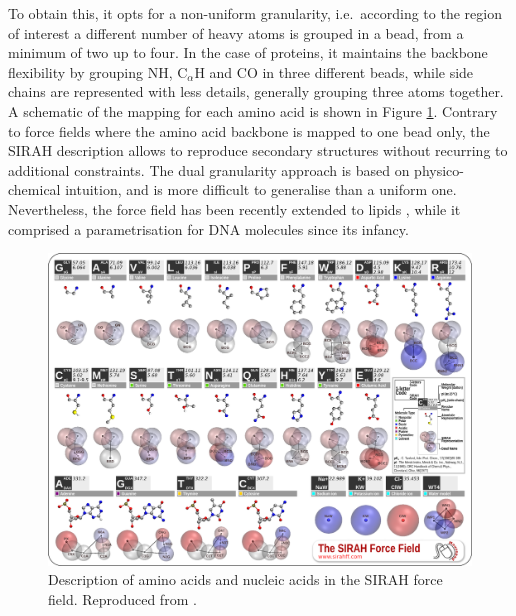 To obtain this, it opts for a non-uniform granularity, i.e.\ according to the region of interest a different number of heavy atoms is grouped in a bead, from a minimum of two up to four. In the case of proteins, it maintains the backbone flexibility by grouping NH, C$_\alpha$H and CO in three different beads, while side chains are represented with less details, generally grouping three atoms together. A schematic of the mapping for each amino acid is shown in Figure \ref{fig:sirah}. Contrary to force fields where the amino acid backbone is mapped to one bead only, the SIRAH description allows to reproduce secondary structures without recurring to additional constraints.
%
The dual granularity approach is based on physico-chemical intuition, and is more difficult to generalise than a uniform one. Nevertheless, the force field has been recently extended to lipids \citep{Barrera2019}, while it comprised a parametrisation for DNA molecules since its infancy.
%
\begin{figure}[t!]
\centering
\includegraphics[width=0.8\linewidth]{2methods/pics/sirah_aa.png}
%
\caption[SIRAH force field amino acid and DNA description]{Description of amino acids and nucleic acids in the SIRAH force field. Reproduced from \citet{sirah_web}.}
\label{fig:sirah}
\end{figure}

